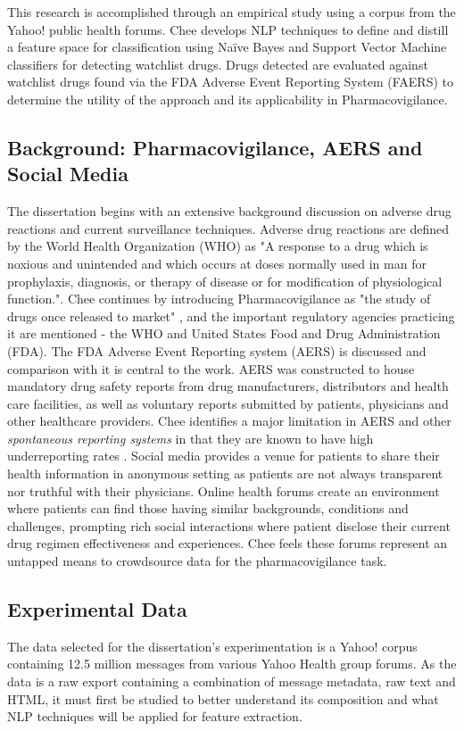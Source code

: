 \documentclass[twoside,11pt]{article}
\begin{document}
This research is accomplished through an empirical study using a corpus from the
Yahoo! public health forums. Chee develops NLP techniques to define and distill a feature space for classification using Na\"ive Bayes and
Support Vector Machine classifiers for detecting watchlist drugs. Drugs detected are evaluated against watchlist drugs found via the FDA Adverse Event Reporting System (FAERS) to determine the utility of the approach and its applicability in Pharmacovigilance. %

\subsection{Background: Pharmacovigilance, AERS and Social Media}
The dissertation begins with an extensive background discussion on adverse drug reactions and current surveillance techniques. Adverse drug reactions are defined by the World Health Organization (WHO) as "A response to a drug which is noxious and unintended and which occurs at doses normally used in man for prophylaxis, diagnosis, or therapy of disease or for modification of physiological function."\cite{FDA}. Chee continues by introducing Pharmacovigilance as "the study of drugs once released to market" \citep{Chee}, and the important regulatory agencies practicing it are mentioned - the WHO and United States Food and Drug Administration (FDA). The FDA Adverse Event Reporting system (AERS) is discussed and comparison with it is central to the work. AERS was constructed to house mandatory drug safety reports from drug manufacturers, distributors and health care facilities, as well as voluntary reports submitted by patients, physicians and other healthcare providers.
Chee identifies a major limitation in AERS and other \textit{spontaneous reporting systems} in that they are known to have high underreporting rates \citep{Fletcher}. Social media provides a venue for patients to share their health information in anonymous setting as patients are not always transparent nor truthful with their physicians. Online health forums create an environment where patients can find those having similar backgrounds, conditions and challenges, prompting rich social interactions where patient disclose their current drug regimen effectiveness and experiences. Chee feels these forums represent an untapped means to crowdsource data for the pharmacovigilance task. %

\subsection{Experimental Data}
The data selected for the dissertation's experimentation is a Yahoo! corpus containing 12.5 million messages from various Yahoo Health group forums. As the data is a raw export containing a combination of message metadata, raw text and HTML, it must first be studied to better understand its composition and what NLP techniques will be applied for feature extraction. %
\end{document}
